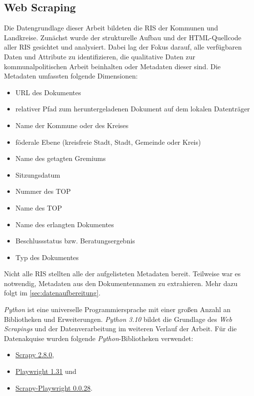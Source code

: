 \subsection{Web Scraping}

Die Datengrundlage dieser Arbeit bildeten die RIS der Kommunen und Landkreise. Zunächst wurde der strukturelle Aufbau und der HTML-Quellcode aller RIS gesichtet und analysiert. Dabei lag der Fokus darauf, alle verfügbaren Daten und Attribute zu identifizieren, die qualitative Daten zur kommunalpolitischen Arbeit beinhalten oder Metadaten dieser sind. Die Metadaten umfassten folgende Dimensionen:

\begin{itemize}
    \item URL des Dokumentes
    \item relativer Pfad zum heruntergeladenen Dokument auf dem lokalen Datenträger
    \item Name der Kommune oder des Kreises
    \item föderale Ebene (kreisfreie Stadt, Stadt, Gemeinde oder Kreis)
    \item Name des getagten Gremiums
    \item Sitzungsdatum
    \item Nummer des TOP
    \item Name des TOP
    \item Name des erlangten Dokumentes
    \item Beschlussstatus bzw. Beratungsergebnis
    \item Typ des Dokumentes
\end{itemize}

Nicht alle RIS stellten alle der aufgelisteten Metadaten bereit. Teilweise war es notwendig, Metadaten aus den Dokumentennamen zu extrahieren. Mehr dazu folgt im \autoref{sec:datenaufbereitung}.

\textit{Python} ist eine universelle Programmiersprache mit einer großen Anzahl an Bibliotheken und Erweiterungen. \textit{Python 3.10} bildet die Grundlage des \textit{Web Scrapings} und der Datenverarbeitung im weiteren Verlauf der Arbeit. Für die Datenakquise wurden folgende \textit{Python}-Bibliotheken verwendet:
\begin{itemize}
    \item \href{https://scrapy.org/}{Scrapy 2.8.0},
    \item \href{https://playwright.dev/python/}{Playwright 1.31} und
    \item \href{https://github.com/scrapy-plugins/scrapy-playwright}{Scrapy-Playwright 0.0.28}.
\end{itemize}

